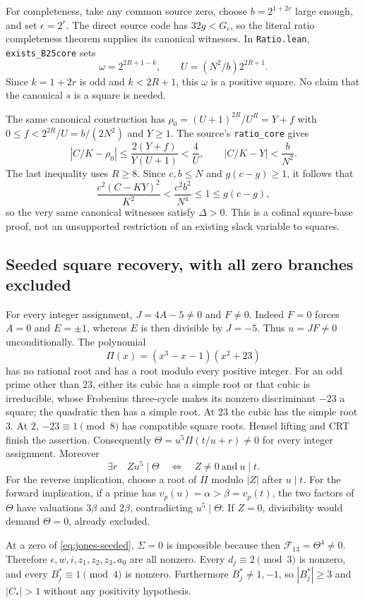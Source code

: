 For completeness, take any common source zero, choose
$b=2^{1+2r}$ large enough, and set $\epsilon=2^r$. The direct source code
has $32g<G_c$, so the literal ratio completeness theorem supplies its
canonical witnesses. In \texttt{Ratio.lean}, \texttt{exists\_B25core} sets
\[
 \omega=2^{2R+1-k},\qquad U=(N^2/b)2^{2R+1}.
\]
Since $k=1+2r$ is odd and $k<2R+1$, this $\omega$ is a positive square.
No claim that the canonical $s$ is a square is needed.

The same canonical construction has
$\rho_0=(U+1)^{2R}/U^R=Y+f$ with
$0\le f<2^{2R}/U=b/(2N^2)$ and $Y\ge1$.
The source's \texttt{ratio\_core} gives
\[
 |C/K-\rho_0|\le\frac{2(Y+f)}{Y(U+1)}<\frac4U,
 \qquad |C/K-Y|<\frac b{N^2}.
\]
The last inequality uses $R\ge8$. Since $c,b\le N$ and
$g(c-g)\ge1$, it follows that
\[
 \frac{c^2(C-KY)^2}{K^2}<\frac{c^2b^2}{N^4}\le1\le g(c-g),
\]
so the very same canonical witnesses satisfy $\Delta>0$.
This is a cofinal square-base proof, not an unsupported restriction of an
existing slack variable to squares.

\subsection{Seeded square recovery, with all zero branches excluded}
For every integer assignment, $J=4A-5\ne0$ and $F\ne0$.
Indeed $F=0$ forces $A=0$ and $E=\pm1$, whereas $E$ is then divisible
by $J=-5$. Thus $u=JF\ne0$ unconditionally.
The polynomial
\[
 \Pi(x)=(x^3-x-1)(x^2+23)
\]
has no rational root and has a root modulo every positive integer.
For an odd prime other than $23$, either its cubic has a simple root or
that cubic is irreducible, whose Frobenius three-cycle makes its
nonzero discriminant $-23$ a square; the quadratic then has a simple root.
At $23$ the cubic has the simple root $3$. At $2$, $-23\equiv1\pmod8$
has compatible square roots. Hensel lifting and CRT finish the assertion.
Consequently $\Theta=u^5\Pi(t/u+r)\ne0$ for every integer assignment.
Moreover
\[
 \exists r\quad Zu^5\mid\Theta
 \quad\Longleftrightarrow\quad Z\ne0\ \text{and}\ u\mid t.
\]
For the reverse implication, choose a root of $\Pi$ modulo $|Z|$ after
$u\mid t$. For the forward implication, if a prime has
$v_p(u)=\alpha>\beta=v_p(t)$, the two factors of $\Theta$ have valuations
$3\beta$ and $2\beta$, contradicting $u^5\mid\Theta$.
If $Z=0$, divisibility would demand $\Theta=0$, already excluded.

At a zero of \eqref{eq:jones-seeded}, $\Sigma=0$ is impossible because
then $\mathcal F_{13}=\Theta^4\ne0$. Therefore
$\epsilon,w,i,z_1,z_2,z_3,a_0$ are all nonzero.
Every $d_j\equiv2\pmod3$ is nonzero, and every
$B_j^*\equiv1\pmod4$ is nonzero. Furthermore $B_j^*\ne1,-1$, so
$|B_j^*|\ge3$ and $|C_*|>1$ without any positivity hypothesis.

